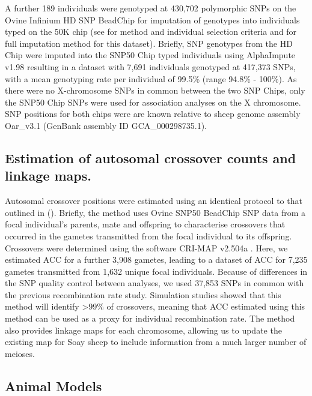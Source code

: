 \documentclass[a4paper,11pt]{article}
\begin{document}
A further 189 individuals were genotyped at 430,702 polymorphic SNPs on the Ovine Infinium HD SNP BeadChip for imputation of genotypes into individuals typed on the 50K chip (see \citealt{Johnston2016} for method and individual selection criteria and \citealt{Stoffel2020} for full imputation method for this dataset). Briefly, SNP genotypes from the HD Chip were imputed into the SNP50 Chip typed individuals using AlphaImpute v1.98 \citep{Hickey2012, Antolin2017} resulting in a dataset with 7,691 individuals genotyped at 417,373 SNPs, with a mean genotyping rate per individual of 99.5\% (range 94.8\% - 100\%). As there were no X-chromosome SNPs in common between the two SNP Chips, only the SNP50 Chip SNPs were used for association analyses on the X chromosome. SNP positions for both chips were are known relative to sheep genome assembly Oar\_v3.1 (GenBank assembly ID GCA\_000298735.1).

\subsection*{Estimation of autosomal crossover counts and linkage maps.}

Autosomal crossover positions were estimated using an identical protocol to that outlined in \citeauthor{Johnston2016} (\citeyear{Johnston2016}). Briefly, the method uses Ovine SNP50 BeadChip SNP data from a focal individual's parents, mate and offspring to characterise crossovers that occurred in the gametes transmitted from the focal individual to its offspring. Crossovers were determined using the software CRI-MAP v2.504a \citep{Green1990}. Here, we estimated ACC for a further 3,908 gametes, leading to a dataset of ACC for 7,235 gametes transmitted from 1,632 unique focal individuals. Because of differences in the SNP quality control between analyses, we used 37,853 SNPs in common with the previous recombination rate study. Simulation studies showed that this method will identify \textgreater 99\% of crossovers, meaning that ACC estimated using this method can be used as a proxy for individual recombination rate. The method also provides linkage maps for each chromosome, allowing us to update the existing map for Soay sheep to include information from a much larger number of meioses.

\subsection*{Animal Models}
\end{document}
